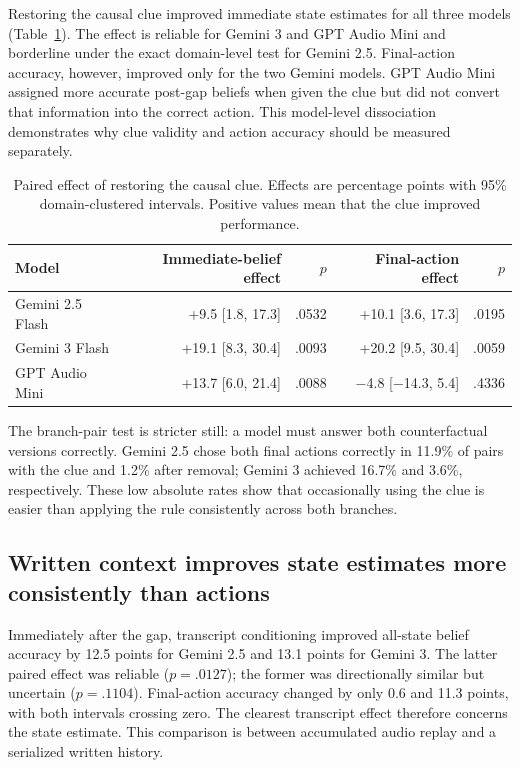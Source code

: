 \documentclass{article}
\newcommand{\dualcolhead}[1]{\textbf{#1}}
\begin{document}
Restoring the causal clue improved immediate state estimates for all three models (Table~\ref{tab:clue-effects}). The effect is reliable for Gemini 3 and GPT Audio Mini and borderline under the exact domain-level test for Gemini 2.5. Final-action accuracy, however, improved only for the two Gemini models. GPT Audio Mini assigned more accurate post-gap beliefs when given the clue but did not convert that information into the correct action. This model-level dissociation demonstrates why clue validity and action accuracy should be measured separately.

\begin{table}[t]
  \centering
  \footnotesize
  \setlength{\tabcolsep}{7pt}
  \renewcommand{\arraystretch}{1.12}
  \caption{Paired effect of restoring the causal clue. Effects are percentage points with 95\% domain-clustered intervals. Positive values mean that the clue improved performance.}
  \label{tab:clue-effects}
  \begin{tabular}{@{}lrrrr@{}}
    \toprule
    \dualcolhead{Model} & \dualcolhead{Immediate-belief effect} & \dualcolhead{$p$} & \dualcolhead{Final-action effect} & \dualcolhead{$p$} \\
    \midrule
    Gemini 2.5 Flash & +9.5 [1.8, 17.3] & .0532 & +10.1 [3.6, 17.3] & .0195 \\
    Gemini 3 Flash & +19.1 [8.3, 30.4] & .0093 & +20.2 [9.5, 30.4] & .0059 \\
    GPT Audio Mini & +13.7 [6.0, 21.4] & .0088 & $-$4.8 [$-$14.3, 5.4] & .4336 \\
    \bottomrule
  \end{tabular}
\end{table}

The branch-pair test is stricter still: a model must answer both counterfactual versions correctly. Gemini 2.5 chose both final actions correctly in 11.9\% of pairs with the clue and 1.2\% after removal; Gemini 3 achieved 16.7\% and 3.6\%, respectively. These low absolute rates show that occasionally using the clue is easier than applying the rule consistently across both branches.

\subsection{Written context improves state estimates more consistently than actions}

Immediately after the gap, transcript conditioning improved all-state belief accuracy by 12.5 points for Gemini 2.5 and 13.1 points for Gemini 3. The latter paired effect was reliable ($p=.0127$); the former was directionally similar but uncertain ($p=.1104$). Final-action accuracy changed by only 0.6 and 11.3 points, with both intervals crossing zero. The clearest transcript effect therefore concerns the state estimate. This comparison is between accumulated audio replay and a serialized written history.
\end{document}
